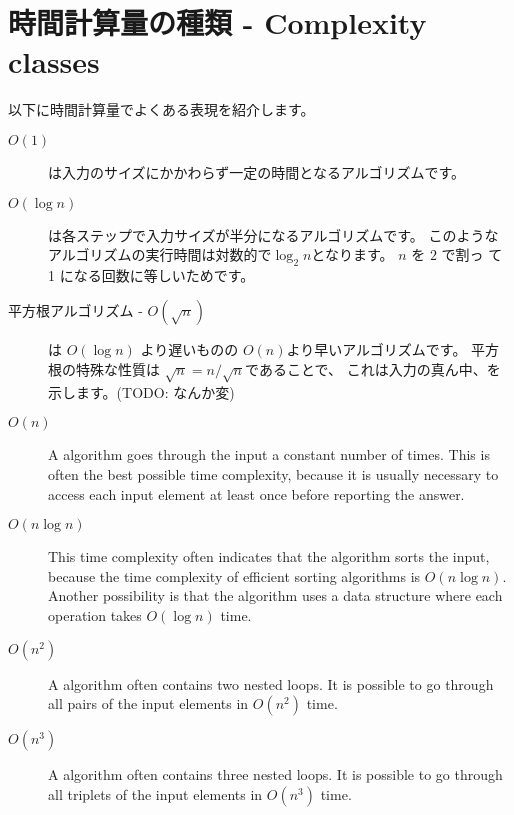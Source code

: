 \section{時間計算量の種類 - Complexity classes}


以下に時間計算量でよくある表現を紹介します。

\begin{description}
\item[$O(1)$]
 は入力のサイズにかかわらず一定の時間となるアルゴリズムです。

\item[$O(\log n)$]
 は各ステップで入力サイズが半分になるアルゴリズムです。
このようなアルゴリズムの実行時間は対数的で$\log_2 n$となります。
$n$ を $2$ で割っ て 1 になる回数に等しいためです。

\item[平方根アルゴリズム - $O(\sqrt n)$]
 は
$O(\log n)$ より遅いものの $O(n)$より早いアルゴリズムです。
平方根の特殊な性質は
$\sqrt n = n/\sqrt n$であることで、
これは入力の真ん中、を示します。(TODO: なんか変)

\item[$O(n)$]
A  algorithm goes through the input
a constant number of times.
This is often the best possible time complexity,
because it is usually necessary to access each
input element at least once before
reporting the answer.

\item[$O(n \log n)$]
This time complexity often indicates that the
algorithm sorts the input,
because the time complexity of efficient
sorting algorithms is $O(n \log n)$.
Another possibility is that the algorithm
uses a data structure where each operation
takes $O(\log n)$ time.

\item[$O(n^2)$]
A  algorithm often contains
two nested loops.
It is possible to go through all pairs of
the input elements in $O(n^2)$ time.

\item[$O(n^3)$]
A  algorithm often contains
three nested loops.
It is possible to go through all triplets of
the input elements in $O(n^3)$ time.


\end{description}
